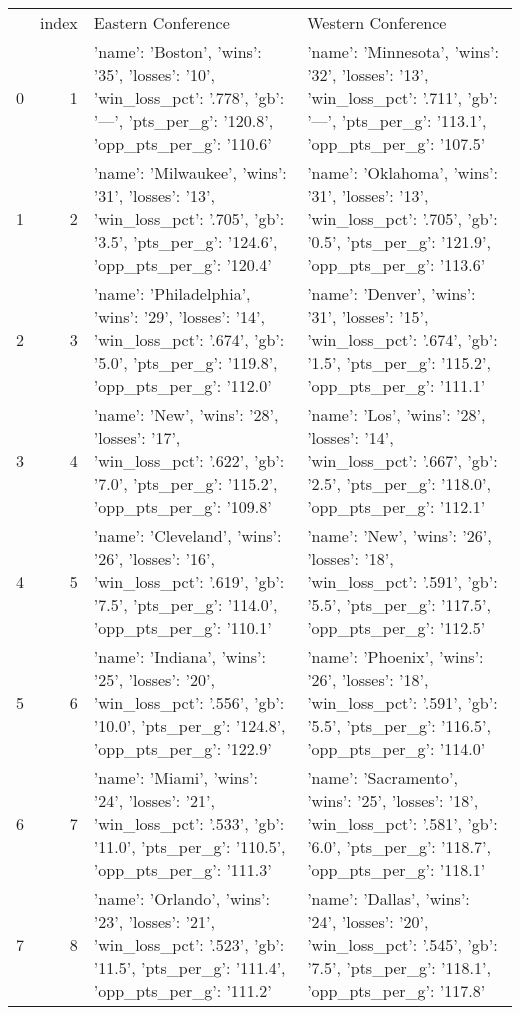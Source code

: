 \begin{tabular}{lrll}
 & index & Eastern Conference & Western Conference \\
0 & 1 & {'name': 'Boston', 'wins': '35', 'losses': '10', 'win_loss_pct': '.778', 'gb': '—', 'pts_per_g': '120.8', 'opp_pts_per_g': '110.6'} & {'name': 'Minnesota', 'wins': '32', 'losses': '13', 'win_loss_pct': '.711', 'gb': '—', 'pts_per_g': '113.1', 'opp_pts_per_g': '107.5'} \\
1 & 2 & {'name': 'Milwaukee', 'wins': '31', 'losses': '13', 'win_loss_pct': '.705', 'gb': '3.5', 'pts_per_g': '124.6', 'opp_pts_per_g': '120.4'} & {'name': 'Oklahoma', 'wins': '31', 'losses': '13', 'win_loss_pct': '.705', 'gb': '0.5', 'pts_per_g': '121.9', 'opp_pts_per_g': '113.6'} \\
2 & 3 & {'name': 'Philadelphia', 'wins': '29', 'losses': '14', 'win_loss_pct': '.674', 'gb': '5.0', 'pts_per_g': '119.8', 'opp_pts_per_g': '112.0'} & {'name': 'Denver', 'wins': '31', 'losses': '15', 'win_loss_pct': '.674', 'gb': '1.5', 'pts_per_g': '115.2', 'opp_pts_per_g': '111.1'} \\
3 & 4 & {'name': 'New', 'wins': '28', 'losses': '17', 'win_loss_pct': '.622', 'gb': '7.0', 'pts_per_g': '115.2', 'opp_pts_per_g': '109.8'} & {'name': 'Los', 'wins': '28', 'losses': '14', 'win_loss_pct': '.667', 'gb': '2.5', 'pts_per_g': '118.0', 'opp_pts_per_g': '112.1'} \\
4 & 5 & {'name': 'Cleveland', 'wins': '26', 'losses': '16', 'win_loss_pct': '.619', 'gb': '7.5', 'pts_per_g': '114.0', 'opp_pts_per_g': '110.1'} & {'name': 'New', 'wins': '26', 'losses': '18', 'win_loss_pct': '.591', 'gb': '5.5', 'pts_per_g': '117.5', 'opp_pts_per_g': '112.5'} \\
5 & 6 & {'name': 'Indiana', 'wins': '25', 'losses': '20', 'win_loss_pct': '.556', 'gb': '10.0', 'pts_per_g': '124.8', 'opp_pts_per_g': '122.9'} & {'name': 'Phoenix', 'wins': '26', 'losses': '18', 'win_loss_pct': '.591', 'gb': '5.5', 'pts_per_g': '116.5', 'opp_pts_per_g': '114.0'} \\
6 & 7 & {'name': 'Miami', 'wins': '24', 'losses': '21', 'win_loss_pct': '.533', 'gb': '11.0', 'pts_per_g': '110.5', 'opp_pts_per_g': '111.3'} & {'name': 'Sacramento', 'wins': '25', 'losses': '18', 'win_loss_pct': '.581', 'gb': '6.0', 'pts_per_g': '118.7', 'opp_pts_per_g': '118.1'} \\
7 & 8 & {'name': 'Orlando', 'wins': '23', 'losses': '21', 'win_loss_pct': '.523', 'gb': '11.5', 'pts_per_g': '111.4', 'opp_pts_per_g': '111.2'} & {'name': 'Dallas', 'wins': '24', 'losses': '20', 'win_loss_pct': '.545', 'gb': '7.5', 'pts_per_g': '118.1', 'opp_pts_per_g': '117.8'} \\

\end{tabular}
